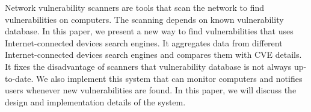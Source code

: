 
\begin{eabstract}
  Network vulnerability scanners are tools that scan the network to find vulnerabilities on computers. 
  The scanning depends on known vulnerability database. In this paper, 
  we present a new way to find vulnerabilities that uses Internet-connected devices search engines. 
  It aggregates data from different Internet-connected devices search engines and compares them with CVE details. 
  It fixes the disadvantage of scanners that vulnerability database is not always up-to-date. 
  We also implement this system that can monitor computers and notifies users whenever new vulnerabilities are found. 
  In this paper, we will discuss the design and implementation details of the system.
\end{eabstract}

